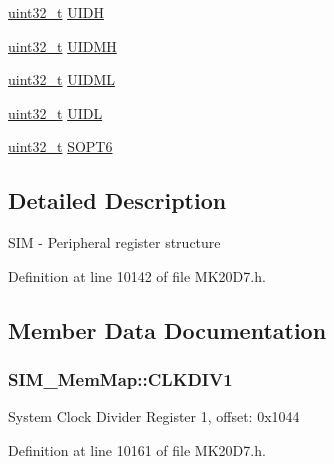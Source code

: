 \begin{DoxyCompactItemize}
\item 
\hyperlink{_p_e___types_8h_a33594304e786b158f3fb30289278f5af}{uint32\+\_\+t} \hyperlink{struct_s_i_m___mem_map_a28fe54037c53da17fa24c0b361dbdfa3}{U\+I\+DH}
\item 
\hyperlink{_p_e___types_8h_a33594304e786b158f3fb30289278f5af}{uint32\+\_\+t} \hyperlink{struct_s_i_m___mem_map_af4fb6d5bc3fa71f9c905570d87a2e93f}{U\+I\+D\+MH}
\item 
\hyperlink{_p_e___types_8h_a33594304e786b158f3fb30289278f5af}{uint32\+\_\+t} \hyperlink{struct_s_i_m___mem_map_a51e871d8ac13db8b605b6ec1b3292be4}{U\+I\+D\+ML}
\item 
\hyperlink{_p_e___types_8h_a33594304e786b158f3fb30289278f5af}{uint32\+\_\+t} \hyperlink{struct_s_i_m___mem_map_ac23a694afa8d84e55fc43ff0c0ec1b29}{U\+I\+DL}
\item 
\hyperlink{_p_e___types_8h_a33594304e786b158f3fb30289278f5af}{uint32\+\_\+t} \hyperlink{struct_s_i_m___mem_map_aa8030cdf04fef86a5fd4b10f7686e5fa}{S\+O\+P\+T6}
\end{DoxyCompactItemize}


\subsection{Detailed Description}
S\+IM -\/ Peripheral register structure 

Definition at line 10142 of file M\+K20\+D7.\+h.



\subsection{Member Data Documentation}
\subsubsection[{\texorpdfstring{C\+L\+K\+D\+I\+V1}{CLKDIV1}}]{ S\+I\+M\+\_\+\+Mem\+Map\+::\+C\+L\+K\+D\+I\+V1}\hypertarget{struct_s_i_m___mem_map_afa315c39ebd4ef380b7f8d67a88d4f82}{}\label{struct_s_i_m___mem_map_afa315c39ebd4ef380b7f8d67a88d4f82}
System Clock Divider Register 1, offset\+: 0x1044 

Definition at line 10161 of file M\+K20\+D7.\+h.

